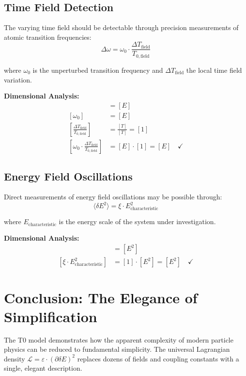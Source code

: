 \documentclass[12pt,a4paper]{report}
\begin{document}
	\subsection{Time Field Detection}
	
	The varying time field should be detectable through precision measurements of atomic transition frequencies:
	\begin{equation}
		\Delta\omega = \omega_0 \cdot \frac{\Delta T_{\text{field}}}{T_{0,\text{field}}}
	\end{equation}
	
	where $\omega_0$ is the unperturbed transition frequency and $\Delta T_{\text{field}}$ the local time field variation.
	
	\textbf{Dimensional Analysis:}
	\begin{align}
		[\Delta\omega] &= [E] \\
		[\omega_0] &= [E] \\
		\left[\frac{\Delta T_{\text{field}}}{T_{0,\text{field}}}\right] &= \frac{[T]}{[T]} = [1] \\
		\left[\omega_0 \cdot \frac{\Delta T_{\text{field}}}{T_{0,\text{field}}}\right] &= [E] \cdot [1] = [E] \quad \checkmark
	\end{align}
	
	\subsection{Energy Field Oscillations}
	
	Direct measurements of energy field oscillations may be possible through:
	\begin{equation}
		\langle \delta E^2 \rangle = \xi \cdot E_{\text{characteristic}}^2
	\end{equation}
	
	where $E_{\text{characteristic}}$ is the energy scale of the system under investigation.
	
	\textbf{Dimensional Analysis:}
	\begin{align}
		[\langle \delta E^2 \rangle] &= [E^2] \\
		[\xi \cdot E_{\text{characteristic}}^2] &= [1] \cdot [E^2] = [E^2] \quad \checkmark
	\end{align}
	
	\section{Conclusion: The Elegance of Simplification}
	
	The T0 model demonstrates how the apparent complexity of modern particle physics can be reduced to fundamental simplicity. The universal Lagrangian density $\mathcal{L} = \varepsilon \cdot (\partial\delta E)^2$ replaces dozens of fields and coupling constants with a single, elegant description.
	
\end{document}
